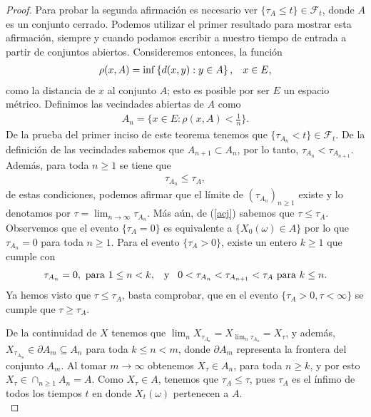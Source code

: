 \begin{proof}
Para probar la segunda afirmación es necesario ver $\{ \tau_A \leq t \} \in \mathcal{F}_t$, donde $A$ es un conjunto cerrado. Podemos utilizar el primer resultado para mostrar esta afirmación, siempre y cuando podamos escribir a nuestro tiempo de entrada a partir de conjuntos abiertos. Consideremos entonces, la función
\begin{align*}
	\rho(x, A) = \inf \left\{ d(x, y) : y \in A \right\}, \hspace{0.3cm} x \in E,
\end{align*}
como la distancia de $x$ al conjunto $A$; esto es posible por ser $E$ un espacio métrico. Definimos las vecindades abiertas de $A$ como
\begin{align*}
	A_n = \bigg\{ x \in E : \rho(x, A) < \frac{1}{n} \bigg\}.
\end{align*}
De la prueba del primer inciso de este teorema tenemos que $\{ \tau_{A_n} < t \} \in \mathcal{F}_t$. De la definición de las vecindades sabemos que $A_{n + 1} \subset A_n$, por lo tanto, $\tau_{A_n} < \tau_{A_{n+1}}$. Además, para toda $n \geq 1$ se tiene que 
\begin{align}
	\tau_{A_n} \leq \tau_A \label{acj}, 
\end{align}
de estas condiciones, podemos afirmar que el límite de $(\tau_{A_n})_{n \geq 1}$ existe y lo denotamos por $\tau = \lim_{n \rightarrow \infty} \tau_{A_n}$. Más aún, de (\ref{acj}) sabemos que $\tau \leq \tau_A$. \\

Observemos que el evento $\{ \tau_A = 0 \}$ es equivalente a $\{ X_0 (\omega) \in A \}$ por lo que $\tau_{A_n} = 0$ para toda $n \geq 1$. Para el evento $\{ \tau_A > 0 \}$, existe un entero $k \geq 1$ que cumple con 
\begin{align*}
	\tau_{A_n} = 0, \text{   para } 1 \leq n < k, \hspace{0.3cm} \text{y} \hspace{0.3cm} 0 < \tau_{A_n} < \tau_{A_{n+1}} < \tau_A \text{   para } k \leq n.
\end{align*}
Ya hemos visto que $\tau \leq \tau_A$, basta comprobar, que en el evento $\{ \tau_A > 0, \tau < \infty \}$ se cumple que $\tau \geq \tau_A$. 

De la continuidad de $X$ tenemos que $\lim_n X_{\tau_{A_n}} = X_{\lim_n \tau_{A_n}} = X_{\tau}$, y además, $X_{\tau_{A_m}} \in \partial A_m \subseteq A_n$ para toda $k \leq n < m$, donde $\partial A_m$ representa la frontera del conjunto $A_m$. Al tomar $m \rightarrow \infty$ obtenemos $X_{\tau} \in A_n$, para toda $n \geq k$, y por esto $X_{\tau} \in \cap_{n \geq 1} A_n = A$. Como $X_{\tau} \in A$, tenemos que $\tau_A \leq \tau$, pues $\tau_A$ es el ínfimo de todos los tiempos $t$ en donde $X_t(\omega)$ pertenecen a $A$. \\


\end{proof}
